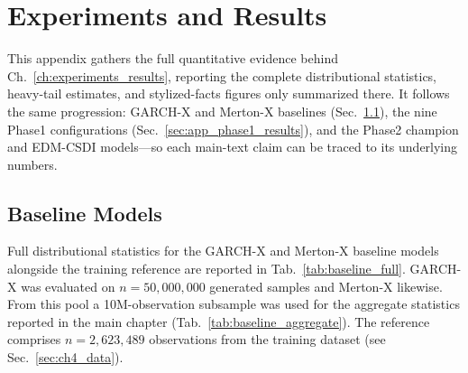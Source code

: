 \chapter{Experiments and Results}

This appendix gathers the full quantitative evidence behind Ch.\ \ref{ch:experiments_results}, reporting the complete distributional statistics, heavy-tail estimates, and stylized-facts figures only summarized there. It follows the same progression: GARCH-X and Merton-X baselines (Sec.\ \ref{sec:app_baselines}), the nine Phase1 configurations (Sec.\ \ref{sec:app_phase1_results}), and the Phase2 champion and EDM-CSDI models—so each main-text claim can be traced to its underlying numbers.

\section{Baseline Models}
\label{sec:app_baselines}
Full distributional statistics for the GARCH-X and Merton-X baseline models alongside
the training reference are reported in Tab.\ \ref{tab:baseline_full}. GARCH-X was
evaluated on $n = 50{,}000{,}000$ generated samples and Merton-X likewise. From this pool a
10M-observation subsample was used for the aggregate statistics reported in the main
chapter (Tab.\ \ref{tab:baseline_aggregate}). The reference
comprises $n = 2{,}623{,}489$ observations from the training dataset (see
Sec.\ \ref{sec:ch4_data}).

